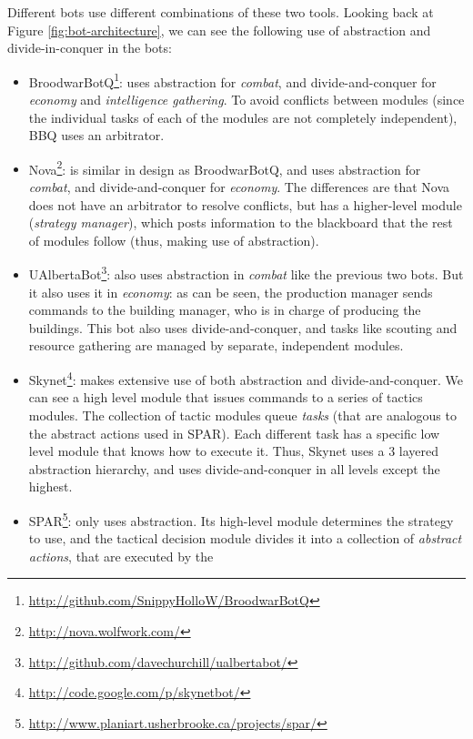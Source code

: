 \documentclass{llncs}
\begin{document}
Different bots use different combinations of these two tools. Looking back at Figure \ref{fig:bot-architecture}, we can see the following use of abstraction and divide-in-conquer in the bots:

\begin{itemize}
\item
  BroodwarBotQ\footnote{\url{http://github.com/SnippyHolloW/BroodwarBotQ}}:
  uses  abstraction for  {\em combat}, and  divide-and-conquer for
  {\em economy}  and  {\em intelligence  gathering}. To  avoid  conflicts
  between modules (since  the individual tasks of each  of the modules
  are not completely independent), BBQ uses an arbitrator.
\item  Nova\footnote{\url{http://nova.wolfwork.com/}}:  is similar  in
  design as  BroodwarBotQ, and uses  abstraction for {\em combat},
  and  divide-and-conquer for  {\em economy}.  The differences  are
  that Nova does not have  an arbitrator to resolve conflicts, but has
  a  higher-level   module  ({\em  strategy   manager}),  which  posts
  information to the blackboard that the rest of modules follow (thus,
  making use of abstraction).
\item
  UAlbertaBot\footnote{\url{http://github.com/davechurchill/ualbertabot/}}:
  also  uses abstraction  in  {\em combat} like  the previous  two
  bots. But it  also uses it in {\em economy}: as  can be seen, the
  production manager sends commands to the building manager, who is in
  charge   of   producing   the   buildings.  This   bot   also   uses
  divide-and-conquer, and  tasks like scouting  and resource gathering
  are managed by separate, independent modules.
\item       Skynet\footnote{\url{http://code.google.com/p/skynetbot/}}:
  makes     extensive     use      of     both     abstraction     and
  divide-and-conquer.  We  can see a  high level module  that issues commands  to a
  series of  tactics modules. The  collection of tactic  modules queue
  {\em  tasks} (that  are analogous  to the  abstract actions  used in
  SPAR).  Each different  task has  a specific  low level  module that
  knows how to  execute it. Thus, Skynet uses  a 3 layered abstraction
  hierarchy,  and uses  divide-and-conquer  in all  levels except  the
  highest.
\item
  SPAR\footnote{\url{http://www.planiart.usherbrooke.ca/projects/spar/}}:
  only uses abstraction. Its high-level module determines the strategy
  to  use,  and  the  tactical  decision  module  divides  it  into  a
  collection  of {\em  abstract  actions}, that  are  executed by  the

\end{itemize}
\end{document}
